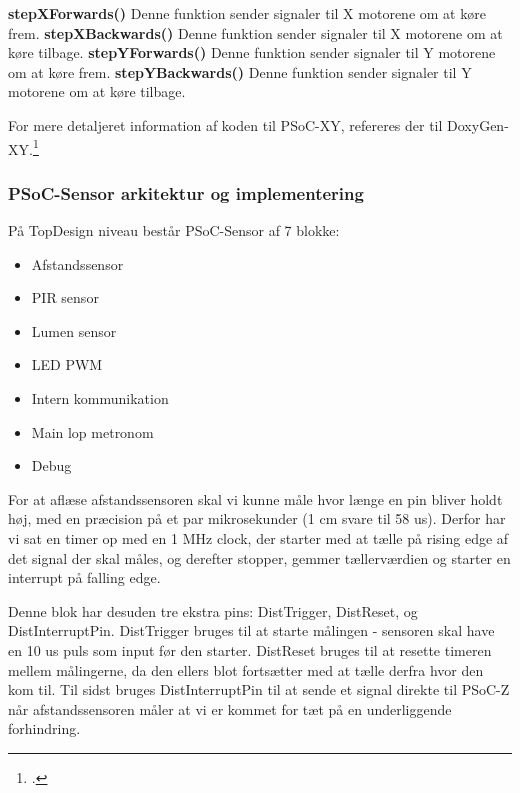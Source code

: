 \textbf{stepXForwards()}\newline
Denne funktion sender signaler til X motorene om at køre frem.\newline
\textbf{stepXBackwards()}\newline
Denne funktion sender signaler til X motorene om at køre tilbage.\newline
\textbf{stepYForwards()}\newline
Denne funktion sender signaler til Y motorene om at køre frem.\newline
\textbf{stepYBackwards()}\newline
Denne funktion sender signaler til Y motorene om at køre tilbage.\newline

For mere detaljeret information af koden til PSoC-XY, refereres der til DoxyGen-XY.\footcite{doxy-xy} 

\subsubsection{PSoC-Sensor arkitektur og implementering}

På TopDesign niveau består PSoC-Sensor af 7 blokke:
\begin{itemize}
	\item Afstandssensor
	\item PIR sensor
    \item Lumen sensor
	\item LED PWM
	\item Intern kommunikation
	\item Main lop metronom
	\item Debug
\end{itemize}

For at aflæse afstandssensoren skal vi kunne måle hvor længe en pin bliver holdt høj, med en præcision på et par mikrosekunder (1 cm svare til 58 us). Derfor har vi sat en timer op med en 1 MHz clock, der starter med at tælle på rising edge af det signal der skal måles, og derefter stopper, gemmer tællerværdien og starter en interrupt på falling edge. 

Denne blok har desuden tre ekstra pins: DistTrigger, DistReset, og DistInterruptPin. DistTrigger bruges til at starte målingen - sensoren skal have en 10 us puls som input før den starter. DistReset bruges til at resette timeren mellem målingerne, da den ellers blot fortsætter med at tælle derfra hvor den kom til. Til sidst bruges DistInterruptPin til at sende et signal direkte til PSoC-Z når afstandssensoren måler at vi er kommet for tæt på en underliggende forhindring.

